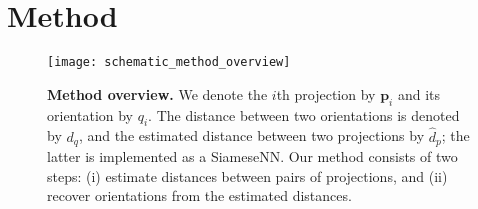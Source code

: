 \section{Method}


\begin{figure}
    \centering
    \texttt{[image: schematic\_method\_overview]}
    \caption{
        \textbf{Method overview.}
        We denote the $i$th projection by $\mathbf{p}_i$ and its orientation by $q_i$. The distance between two orientations is denoted by $d_q$, and the estimated distance between two projections by $\widehat{d}_p$; the latter is implemented as a SiameseNN.
        Our method consists of two steps: (i) estimate distances between pairs of projections, and (ii) recover orientations from the estimated distances.
    }\label{fig:schematic:method-overview}
\end{figure}

